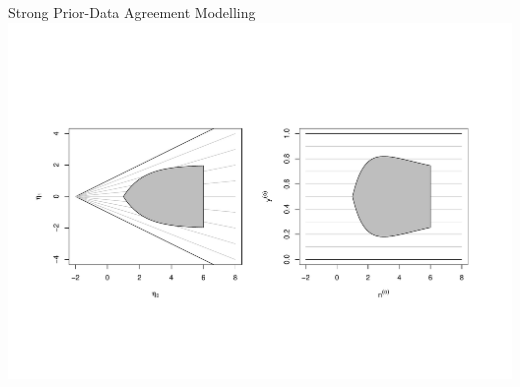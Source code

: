 \documentclass{beamer}
\begin{document}
\begin{frame}[label=boat-app]{Strong Prior-Data Agreement Modelling \hyperlink{boat-back<2>}{\beamerreturnbutton{}}}
\includegraphics[trim = 15mm 45mm 25mm 60mm, clip, width=\textwidth]{boatshape-prior}
\end{frame}

\addtocounter{framenumber}{-3} 
\end{document}
